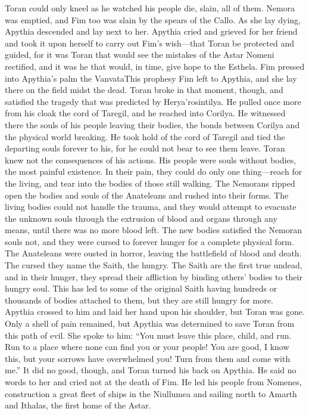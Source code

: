 \documentclass[smalldemyvopaper,11pt,twoside,onecolumn,openright,extrafontsizes]{memoir}
\begin{document}
	Toran could only kneel as he watched his people die, slain, all of them. Nemora was emptied, and Fim too was slain by the spears of the Callo. As she lay dying, Apythia descended and lay next to her. Apythia cried and grieved for her friend and took it upon herself to carry out Fim’s wish—that Toran be protected and guided, for it was Toran that would see the mistakes of the Astar Nomeni rectified, and it was he that would, in time, give hope to the Esthela. Fim pressed into Apythia’s palm the VanvataThis prophesy Fim left to Apythia, and she lay there on the field midst the dead. Toran broke in that moment, though, and satisfied the tragedy that was predicted by Herya’rosintilya. He pulled once more from his cloak the cord of Taregil, and he reached into Corilya. He witnessed there the souls of his people leaving their bodies, the bonds between Corilya and the physical world breaking. He took hold of the cord of Taregil and tied the departing souls forever to his, for he could not bear to see them leave. Toran knew not the consequences of his actions. His people were souls without bodies, the most painful existence. In their pain, they could do only one thing—reach for the living, and tear into the bodies of those still walking. The Nemorans ripped open the bodies and souls of the Anateleans and rushed into their forms. The living bodies could not handle the trauma, and they would attempt to evacuate the unknown souls through the extrusion of blood and organs through any means, until there was no more blood left. The new bodies satisfied the Nemoran souls not, and they were cursed to forever hunger for a complete physical form.
	The Anateleans were ousted in horror, leaving the battlefield of blood and death. The cursed they name the Saith, the hungry. The Saith are the first true undead, and in their hunger, they spread their affliction by binding others’ bodies to their hungry soul. This has led to some of the original Saith having hundreds or thousands of bodies attached to them, but they are still hungry for more. Apythia crossed to him and laid her hand upon his shoulder, but Toran was gone. Only a shell of pain remained, but Apythia was determined to save Toran from this path of evil. She spoke to him:
	“You must leave this place, child, and run. Run to a place where none can find you or your people! You are good, I know this, but your sorrows have overwhelmed you! Turn from them and come with me.”
	It did no good, though, and Toran turned his back on Apythia. He said no words to her and cried not at the death of Fim. He led his people from Nomenes, construction a great fleet of ships in the Niullumea and sailing north to Amarth and Ithalas, the first home of the Astar.
\end{document}
